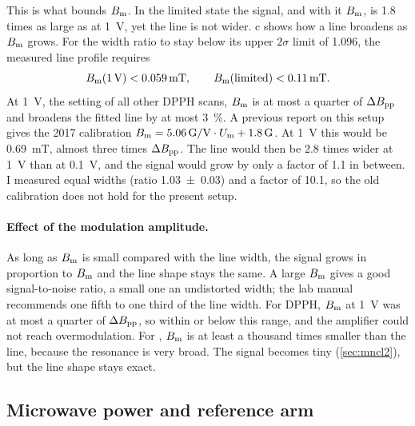 This is what bounds $B_\mathrm{m}$. In the limited state the signal, and with it $B_\mathrm{m}$, is 1.8 times as large as at \qty{1}{V},
yet the line is not wider. c shows how a line broadens as $B_\mathrm{m}$ grows. For the width ratio to stay
below its upper $2\sigma$ limit of \num{1.096}, the measured line profile requires
\begin{equation}\label{eq:bm}
  B_\mathrm{m}(\qty{1}{V})<\qty{0.059}{mT},\qquad B_\mathrm{m}(\text{limited})<\qty{0.11}{mT}.
\end{equation}
At \qty{1}{V}, the setting of all other DPPH scans, $B_\mathrm{m}$ is at most a quarter of $\Delta B_\mathrm{pp}$ and broadens the
fitted line by at most \qty{3}{\percent}. A previous report on this setup gives the 2017 calibration
$B_\mathrm{m}=\qty{5.06}{G/V}\cdot U_\mathrm m+\qty{1.8}{G}$. At \qty{1}{V} this would be \qty{0.69}{mT}, almost three times
$\Delta B_\mathrm{pp}$. The line would then be 2.8 times wider at \qty{1}{V} than at \qty{0.1}{V}, and the signal would grow by only a
factor of 1.1 in between. I measured equal widths (ratio \num{1.03(3)}) and a factor of 10.1, so the old calibration does
not hold for the present setup.

\paragraph{Effect of the modulation amplitude.}
As long as $B_\mathrm{m}$ is small compared with the line width, the signal grows in proportion to $B_\mathrm{m}$ and the line shape stays
the same. A large $B_\mathrm{m}$ gives a good signal-to-noise ratio, a small one an undistorted width; the lab manual recommends
one fifth to one third of the line width. For DPPH, $B_\mathrm{m}$ at \qty{1}{V} was at most a quarter of $\Delta B_\mathrm{pp}$, so within or
below this range, and the amplifier could not reach overmodulation. For , $B_\mathrm{m}$ is at least a thousand times
smaller than the line, because the resonance is very broad. The signal becomes tiny (\cref{sec:mncl2}), but the line shape stays exact.

\subsection{Microwave power and reference arm}\label{sec:power}

